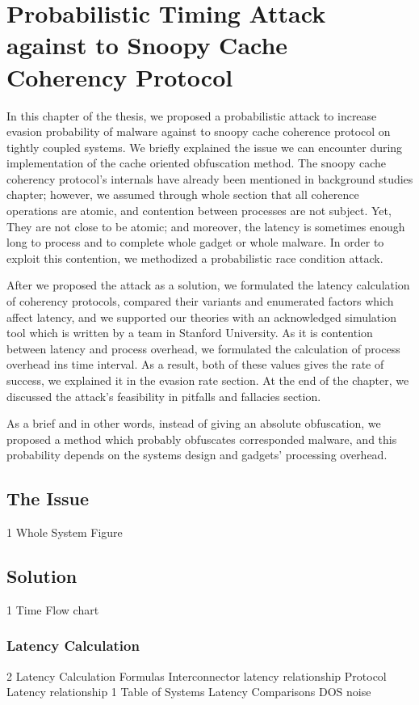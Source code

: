 \chapter{Probabilistic Timing Attack against to Snoopy Cache Coherency Protocol}
In this chapter of the thesis, we proposed a probabilistic attack to increase evasion probability of malware against to snoopy cache coherence protocol on tightly coupled systems. We briefly explained the issue we can encounter during implementation of the cache oriented obfuscation method. The snoopy cache coherency protocol's internals have already been mentioned in background studies chapter; however, we assumed through whole section that all coherence operations are atomic, and contention between processes are not subject. Yet, They are not close to be atomic; and moreover, the latency is sometimes enough long to process and to complete whole gadget or whole malware. In order to exploit this contention, we methodized a probabilistic race condition attack. 

After we proposed the attack as a solution, we formulated the latency calculation of coherency protocols, compared their variants and enumerated factors which affect latency, and we supported our theories with an acknowledged simulation tool which is written by a team in Stanford University. As it is contention between latency and process overhead, we formulated the calculation of process overhead ins time interval. As a result, both of these values gives the rate of success, we explained it in the evasion rate section. At the end of the chapter, we discussed the attack's feasibility in pitfalls and fallacies section.

As a brief and in other words, instead of giving an absolute obfuscation, we proposed a method which probably obfuscates corresponded malware, and this probability depends on the systems design and gadgets' processing overhead. 

\section{The Issue}
1 Whole System Figure

\section{Solution}
1 Time Flow chart
\subsection{Latency Calculation}
2 Latency Calculation Formulas
Interconnector latency relationship
Protocol Latency relationship
1 Table of Systems Latency Comparisons
DOS noise 
